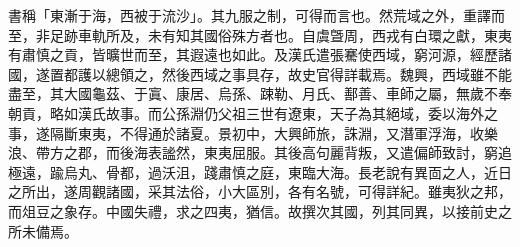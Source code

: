 \begin{pinyinscope}
 
 
 書稱「東漸于海，西被于流沙」。其九服之制，可得而言也。然荒域之外，重譯而至，非足跡車軌所及，未有知其國俗殊方者也。自虞曁周，西戎有白環之獻，東夷有肅慎之貢，皆曠世而至，其遐遠也如此。及漢氏遣張騫使西域，窮河源，經歷諸國，遂置都護以總領之，然後西域之事具存，故史官得詳載焉。魏興，西域雖不能盡至，其大國龜茲、于寘、康居、烏孫、踈勒、月氏、鄯善、車師之屬，無歲不奉朝貢，略如漢氏故事。而公孫淵仍父祖三世有遼東，天子為其絕域，委以海外之事，遂隔斷東夷，不得通於諸夏。景初中，大興師旅，誅淵，又潛軍浮海，收樂浪、帶方之郡，而後海表謐然，東夷屈服。其後高句麗背叛，又遣偏師致討，窮追極遠，踰烏丸、骨都，過沃沮，踐肅慎之庭，東臨大海。長老說有異靣之人，近日之所出，遂周觀諸國，采其法俗，小大區別，各有名號，可得詳紀。雖夷狄之邦，而俎豆之象存。中國失禮，求之四夷，猶信。故撰次其國，列其同異，以接前史之所未備焉。
 
 
\end{pinyinscope}